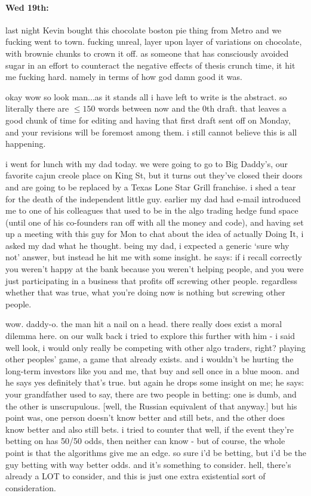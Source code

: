 \documentclass[12pt]{article}
\begin{document}
\paragraph{Wed 19th:} last night Kevin bought this chocolate boston pie thing from Metro and we fucking went to town. fucking unreal, layer upon layer of variations on chocolate, with brownie chunks to crown it off. as someone that has consciously avoided sugar in an effort to counteract the negative effects of thesis crunch time, it hit me fucking hard. namely in terms of how god damn good it was. \par 
okay wow so look man...as it stands all i have left to write is the abstract. so literally there are $\leq 150$ words between now and the 0th draft. that leaves a good chunk of time for editing and having that first draft sent off on Monday, and your revisions will be foremost among them. i still cannot believe this is all happening. \par 
i went for lunch with my dad today. we were going to go to Big Daddy's, our favorite cajun creole place on King St, but it turns out they've closed their doors and are going to be replaced by a Texas Lone Star Grill franchise. i shed a tear for the death of the independent little guy. earlier my dad had e-mail introduced me to one of his colleagues that used to be in the algo trading hedge fund space (until one of his co-founders ran off with all the money and code), and having set up a meeting with this guy for Mon to chat about the idea of actually Doing It, i asked my dad what he thought. being my dad, i expected a generic `sure why not' answer, but instead he hit me with some insight. he says: if i recall correctly you weren't happy at the bank because you weren't helping people, and you were just participating in a business that profits off screwing other people. regardless whether that was true, what you're doing now is nothing but screwing other people. \par 
wow. daddy-o. the man hit a nail on a head. there really does exist a moral dilemma here. on our walk back i tried to explore this further with him - i said well look, i would only really be competing with other algo traders, right? playing other peoples' game, a game that already exists. and i wouldn't be hurting the long-term investors like you and me, that buy and sell once in a blue moon. and he says yes definitely that's true. but again he drops some insight on me; he says: your grandfather used to say, there are two people in betting: one is dumb, and the other is unscrupulous. [well, the Russian equivalent of that anyway.] but his point was, one person doesn't know better and still bets, and the other does know better and also still bets. i tried to counter that well, if the event they're betting on has 50/50 odds, then neither can know - but of course, the whole point is that the algorithms give me an edge. so sure i'd be betting, but i'd be the guy betting with way better odds. and it's something to consider. hell, there's already a LOT to consider, and this is just one extra existential sort of consideration. 
\clearpage 
\end{document}
